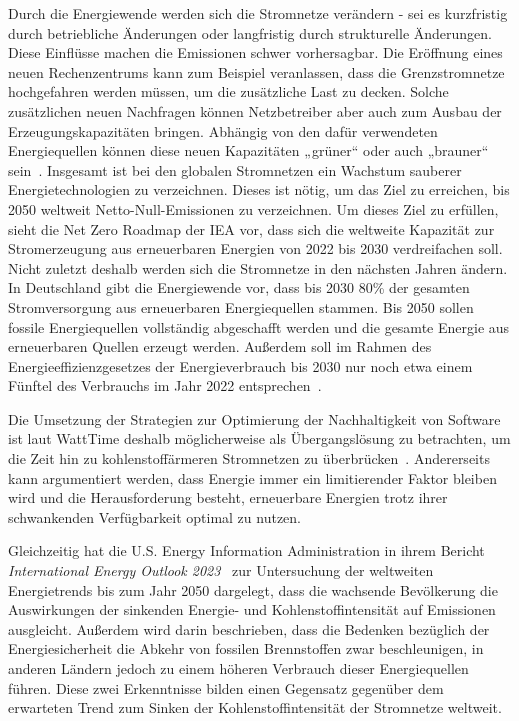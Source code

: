 Durch die Energiewende werden sich die Stromnetze verändern - sei es kurzfristig durch betriebliche Änderungen oder langfristig durch strukturelle Änderungen.
Diese Einflüsse machen die Emissionen schwer vorhersagbar.
Die Eröffnung eines neuen Rechenzentrums kann zum Beispiel veranlassen, dass die Grenzstromnetze hochgefahren werden müssen, um die zusätzliche Last zu decken.
Solche zusätzlichen neuen Nachfragen können Netzbetreiber aber auch zum Ausbau der Erzeugungskapazitäten bringen.
Abhängig von den dafür verwendeten Energiequellen können diese neuen Kapazitäten „grüner“ oder auch „brauner“ sein~\cite{WattTime.2022}.
Insgesamt ist bei den globalen Stromnetzen ein Wachstum sauberer Energietechnologien zu verzeichnen.
Dieses ist nötig, um das Ziel zu erreichen, bis 2050 weltweit Netto-Null-Emissionen zu verzeichnen.
Um dieses Ziel zu erfüllen, sieht die Net Zero Roadmap der IEA vor, dass sich die weltweite Kapazität zur Stromerzeugung aus erneuerbaren Energien von 2022 bis 2030 verdreifachen soll.
Nicht zuletzt deshalb werden sich die Stromnetze in den nächsten Jahren ändern.
In Deutschland gibt die Energiewende vor, dass bis 2030 80\% der gesamten Stromversorgung aus erneuerbaren Energiequellen stammen.
Bis 2050 sollen fossile Energiequellen vollständig abgeschafft werden und die gesamte Energie aus erneuerbaren Quellen erzeugt werden.
Außerdem soll im Rahmen des Energieeffizienzgesetzes der Energieverbrauch bis 2030 nur noch etwa einem Fünftel des Verbrauchs im Jahr 2022 entsprechen~\cite{InternationalEnergyAgengy.2023}.

Die Umsetzung der Strategien zur Optimierung der Nachhaltigkeit von Software ist laut WattTime deshalb möglicherweise als Übergangslösung zu betrachten, um die Zeit hin zu kohlenstoffärmeren Stromnetzen zu überbrücken~\cite{WattTime.12.3.2024}.
Andererseits kann argumentiert werden, dass Energie immer ein limitierender Faktor bleiben wird und die Herausforderung besteht, erneuerbare Energien trotz ihrer schwankenden Verfügbarkeit optimal zu nutzen.

Gleichzeitig hat die U.S. Energy Information Administration in ihrem Bericht \textit{International Energy Outlook 2023}~\cite{U.S.EnergyInformationAdministration.2023} zur Untersuchung der weltweiten Energietrends bis zum Jahr 2050 dargelegt, dass die wachsende Bevölkerung die Auswirkungen der sinkenden Energie- und Kohlenstoffintensität auf Emissionen ausgleicht.
Außerdem wird darin beschrieben, dass die Bedenken bezüglich der Energiesicherheit die Abkehr von fossilen Brennstoffen zwar beschleunigen, in anderen Ländern jedoch zu einem höheren Verbrauch dieser Energiequellen führen.
Diese zwei Erkenntnisse bilden einen Gegensatz gegenüber dem erwarteten Trend zum Sinken der Kohlenstoffintensität der Stromnetze weltweit.


